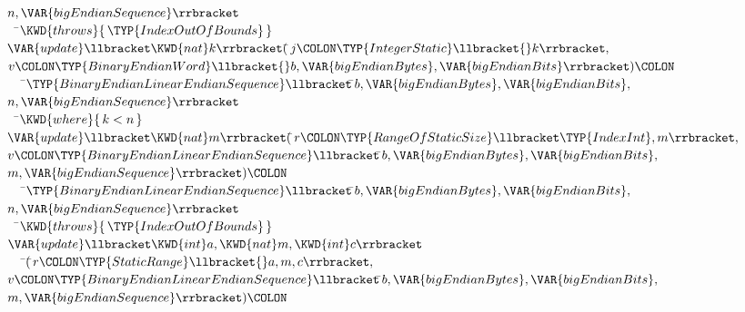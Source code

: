\begin{Fortress}
\(                                       n,\VAR{bigEndianSequence}\rrbracket\)\-\-\\\poptabs\poptabs
{\tt~~}\pushtabs\=\+\(    \KWD{throws} \{\,\TYP{IndexOutOfBounds}\,\}\)\-\\\poptabs
\(  \VAR{update}\llbracket\KWD{nat} k\rrbracket(\null\)\pushtabs\=\+\(j\COLON \TYP{IntegerStatic}\llbracket{}k\rrbracket,\)\\
\(                  v\COLON \TYP{BinaryEndianWord}\llbracket{}b, \VAR{bigEndianBytes}, \VAR{bigEndianBits}\rrbracket)\COLON \)\-\\\poptabs
{\tt~~~}\pushtabs\=\+\(     \TYP{BinaryEndianLinearEndianSequence}\llbracket\null\)\pushtabs\=\+\(b,\VAR{bigEndianBytes},\VAR{bigEndianBits},\)\\
\(                                       n,\VAR{bigEndianSequence}\rrbracket\)\-\-\\\poptabs\poptabs
{\tt~~}\pushtabs\=\+\(    \KWD{where} \{\,k < n\,\}\)\-\\\poptabs
\(  \VAR{update}\llbracket\KWD{nat} m\rrbracket(\null\)\pushtabs\=\+\(r\COLON \TYP{RangeOfStaticSize}\llbracket\TYP{IndexInt},m\rrbracket,\)\\
\(                  v\COLON \TYP{BinaryEndianLinearEndianSequence}\llbracket\null\)\pushtabs\=\+\(b,\VAR{bigEndianBytes},\VAR{bigEndianBits},\)\\
\(                                                       m,\VAR{bigEndianSequence}\rrbracket)\COLON \)\-\-\\\poptabs\poptabs
{\tt~~~}\pushtabs\=\+\(     \TYP{BinaryEndianLinearEndianSequence}\llbracket\null\)\pushtabs\=\+\(b,\VAR{bigEndianBytes},\VAR{bigEndianBits},\)\\
\(                                       n,\VAR{bigEndianSequence}\rrbracket\)\-\-\\\poptabs\poptabs
{\tt~~}\pushtabs\=\+\(    \KWD{throws} \{\,\TYP{IndexOutOfBounds}\,\}\)\-\\\poptabs
\(  \VAR{update}\llbracket\KWD{int} a,\KWD{nat} m,\KWD{int} c\rrbracket\)\\
{\tt~~~}\pushtabs\=\+\(     (\null\)\pushtabs\=\+\(r\COLON \TYP{StaticRange}\llbracket{}a,m,c\rrbracket,\)\\
\(      v\COLON \TYP{BinaryEndianLinearEndianSequence}\llbracket\null\)\pushtabs\=\+\(b,\VAR{bigEndianBytes},\VAR{bigEndianBits},\)\\
\(                                           m,\VAR{bigEndianSequence}\rrbracket)\COLON \)\-\-\\\poptabs\poptabs

\end{Fortress}
